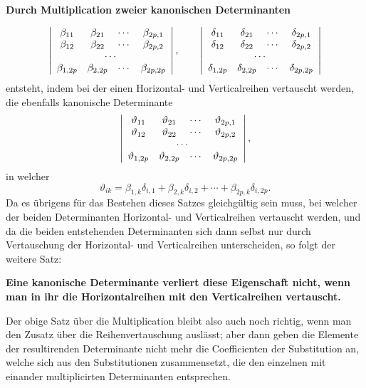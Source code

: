 \documentclass[10pt]{article}
\begin{document}
\begin{center}
\textbf{Durch Multiplication zweier kanonischen Determinanten}
\end{center}
\[
\left|\begin{array}{cccc}
\beta_{11}&\beta_{21}&\cdots&\beta_{2p,1}\\
\beta_{12}&\beta_{22}&\cdots&\beta_{2p,2}\\
\multicolumn{4}{c}{\cdots}\\
\beta_{1,2p}&\beta_{2,2p}&\cdots&\beta_{2p,2p}
\end{array}\right|,
\qquad
\left|\begin{array}{cccc}
\delta_{11}&\delta_{21}&\cdots&\delta_{2p,1}\\
\delta_{12}&\delta_{22}&\cdots&\delta_{2p,2}\\
\multicolumn{4}{c}{\cdots}\\
\delta_{1,2p}&\delta_{2,2p}&\cdots&\delta_{2p,2p}
\end{array}\right|
\]
entsteht, indem bei der einen Horizontal- und Verticalreihen vertauscht werden, die ebenfalls kanonische Determinante
\[
\left|\begin{array}{cccc}
\vartheta_{11}&\vartheta_{21}&\cdots&\vartheta_{2p,1}\\
\vartheta_{12}&\vartheta_{22}&\cdots&\vartheta_{2p,2}\\
\multicolumn{4}{c}{\cdots}\\
\vartheta_{1,2p}&\vartheta_{2,2p}&\cdots&\vartheta_{2p,2p}
\end{array}\right|,
\]
in welcher
\[
\vartheta_{ik}=\beta_{1,k}\delta_{i,1}+\beta_{2,k}\delta_{i,2}+\cdots+\beta_{2p,k}\delta_{i,2p}.
\]
Da es übrigens für das Bestehen dieses Satzes gleichgültig sein muss, bei welcher der beiden Determinanten Horizontal- und Verticalreihen vertauscht werden, und da die beiden entstehenden Determinanten sich dann selbst nur durch Vertauschung der Horizontal- und Verticalreihen unterscheiden, so folgt der weitere Satz:

\begin{center}
\textbf{Eine kanonische Determinante verliert diese Eigenschaft nicht, wenn man in ihr die Horizontalreihen mit den Verticalreihen vertauscht.}
\end{center}

Der obige Satz über die Multiplication bleibt also auch noch richtig, wenn man den Zusatz über die Reihenvertauschung auslässt; aber dann geben die Elemente der resultirenden Determinante nicht mehr die Coefficienten der Substitution an, welche sich aus den Substitutionen zusammensetzt, die den einzelnen mit einander multiplicirten Determinanten entsprechen.
\end{document}
